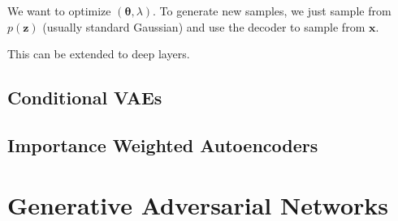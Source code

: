 \documentclass{article}
\begin{document}
    We want to optimize $(\boldsymbol{\theta}, \lambda)$. To generate new samples, we just sample from $p(\mathbf{z})$ (usually standard Gaussian) and use the decoder to sample from $\mathbf{x}$.  

    This can be extended to deep layers. 

  \subsection{Conditional VAEs}

  \subsection{Importance Weighted Autoencoders}

\section{Generative Adversarial Networks}
\end{document}
